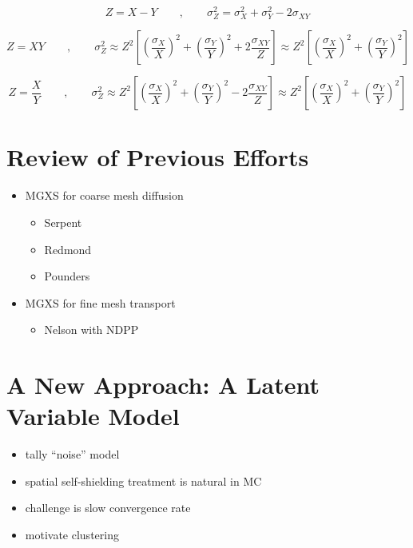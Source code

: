 \begin{equation}
Z = X - Y \qquad,\qquad \sigma_{Z}^{2} = \sigma_{X}^{2} + \sigma_{Y}^{2} - 2\sigma_{XY}
\end{equation}

\begin{equation}
Z = XY \qquad,\qquad \sigma_{Z}^{2} \approx Z^{2}\left[\left(\frac{\sigma_{X}}{X}\right)^{2} + \left(\frac{\sigma_{Y}}{Y}\right)^{2} + 2\frac{\sigma_{XY}}{Z}\right] \approx Z^{2}\left[\left(\frac{\sigma_{X}}{X}\right)^{2} + \left(\frac{\sigma_{Y}}{Y}\right)^{2}\right]
\end{equation}

\begin{equation}
Z = \frac{X}{Y} \qquad,\qquad \sigma_{Z}^{2} \approx Z^{2}\left[\left(\frac{\sigma_{X}}{X}\right)^{2} + \left(\frac{\sigma_{Y}}{Y}\right)^{2} - 2\frac{\sigma_{XY}}{Z}\right] \approx Z^{2}\left[\left(\frac{\sigma_{X}}{X}\right)^{2} + \left(\frac{\sigma_{Y}}{Y}\right)^{2}\right]
\end{equation}


\section{Review of Previous Efforts}
\label{sec:chap3-lit-review}

\begin{itemize}[noitemsep]
  \item \ac{MGXS} for coarse mesh diffusion
  \begin{itemize}[noitemsep]
    \item Serpent
    \item Redmond
    \item Pounders
  \end{itemize}
  \item \ac{MGXS} for fine mesh transport
  \begin{itemize}[noitemsep]
    \item Nelson with NDPP
  \end{itemize}
\end{itemize}


\section{A New Approach: A Latent Variable Model}
\label{sec:chap3-latent-variables}

\begin{itemize}[noitemsep]
  \item tally ``noise'' model
  \item spatial self-shielding treatment is natural in \ac{MC}
  \item challenge is slow convergence rate
  \item motivate clustering
\end{itemize}